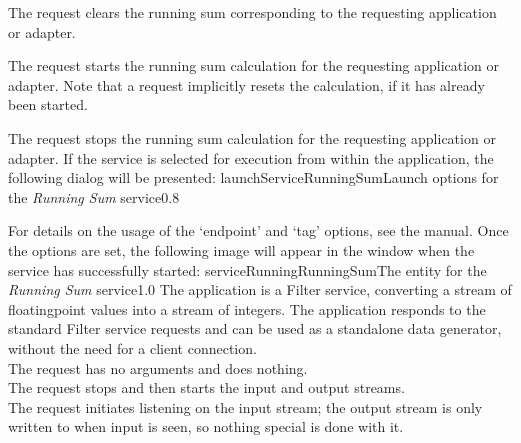 The  request clears the running sum
corresponding to the requesting application or adapter.\\
%

The  request starts the running sum
calculation for the requesting application or adapter.
Note that a  request implicitly resets the
calculation, if it has already been started.\\
%

The  request stops the running sum
calculation for the requesting application or adapter.
%
\condPage
If the service is selected for execution from within the \emph{\CMU} application, the
following dialog will be presented:
%
{launchServiceRunningSum}{Launch options for the \emph{Running Sum} service}{0.8}

For details on the usage of the `endpoint' and `tag' options, see the \emph{\CMU} manual.
Once the options are set, the following image will appear in the \emph{\CMU} window when
the service has successfully started:
%
{serviceRunningRunningSum}{The \emph{\CMU} entity for the \emph{Running Sum} service}{1.0}
The  application is a Filter
service, converting a stream of floating\longDash{}point values into a stream of integers.
The application responds to the standard Filter service requests and can be used as a
standalone data generator, without the need for a client connection.\\

The  request has no arguments and
does nothing.\\

The  request stops and then
starts the input and output streams.\\

The  request initiates listening
on the input stream; the output stream is only written to when input is seen, so nothing
special is done with it.\\

